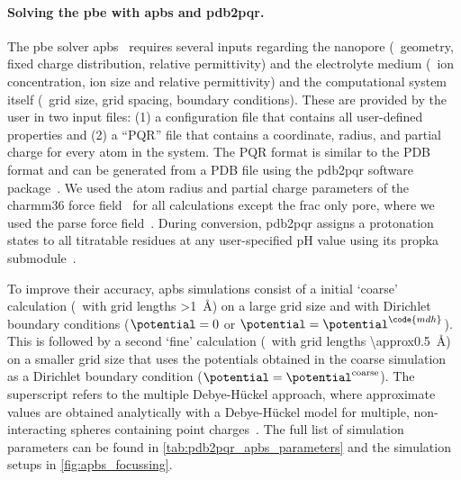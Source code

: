 \paragraph{Solving the \gls{pbe} with \gls{apbs} and \gls{pdb2pqr}.}
%
The \gls{pbe} solver \gls{apbs}~\cite{Jurrus-2018,Baker-2001} requires several inputs regarding the nanopore
(\ie~geometry, fixed charge distribution, relative permittivity) and the electrolyte medium (\ie~ion
concentration, ion size and relative permittivity) and the computational system itself (\ie~grid size, grid
spacing, boundary conditions). These are provided by the user in two input files: (1) a configuration file
that contains all user-defined properties and (2) a ``PQR'' file that contains a coordinate, radius, and
partial charge for every atom in the system. The PQR format is similar to the PDB format and can be generated
from a PDB file using the \gls{pdb2pqr} software package~\cite{Jurrus-2018,Dolinsky-2004,Dolinsky-2007}. We
used the atom radius and partial charge parameters of the \gls{charmm36} force field~\cite{Huang-2013} for all
calculations except the \gls{frac} only pore, where we used the \gls{parse} force
field~\cite{Sitkoff-1994,Sitkoff-1996}. During conversion, \gls{pdb2pqr} assigns a protonation states to all
titratable residues at any user-specified pH value using its \gls{propka} submodule~\cite{Li-2005}.

To improve their accuracy, \gls{apbs} simulations consist of a initial `coarse' calculation (\ie~with grid
lengths \SI{>1}{\angstrom}) on a large grid size and with Dirichlet boundary conditions ($\potential = 0$ or
$\potential = \potential^{\code{mdh}}$). This is followed by a second `fine' calculation (\ie~with grid
lengths \SI{\approx0.5}{\angstrom}) on a smaller grid size that uses the potentials obtained in the coarse
simulation as a Dirichlet boundary condition ($\potential = \potential^{\mathrm{coarse}}$). The 
superscript refers to the multiple Debye-H\"{u}ckel approach, where approximate values are obtained
analytically with a Debye-H\"{u}ckel model for multiple, non-interacting spheres containing point
charges~\cite{Baker-2001,Baker-2005,Stone-2010}. The full list of simulation parameters can be found in
\cref{tab:pdb2pqr_apbs_parameters} and the simulation setups in \cref{fig:apbs_focussing}.

